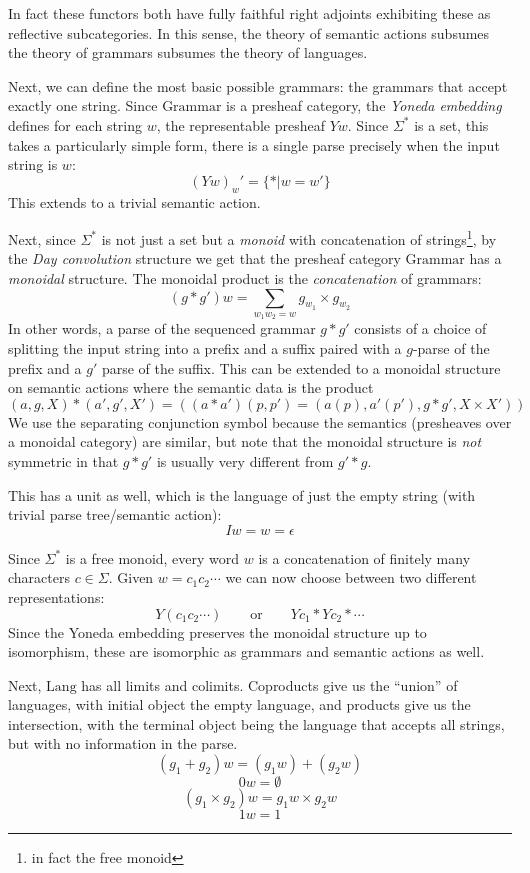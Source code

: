 \documentclass[12pt]{article}
\newcommand{\Lang}{\textrm{Lang}}
\newcommand{\Grammar}{\textrm{Grammar}}
\newcommand\sepconj{\mathbin{*}}
\begin{document}
In fact these functors both have fully faithful right adjoints
exhibiting these as reflective subcategories. In this sense, the
theory of semantic actions subsumes the theory of grammars subsumes
the theory of languages.

Next, we can define the most basic possible grammars: the grammars
that accept exactly one string.
%
Since $\Grammar$ is a presheaf category, the \emph{Yoneda embedding}
defines for each string $w$, the representable presheaf $Y w$. Since
$\Sigma^*$ is a set, this takes a particularly simple form, there is a
single parse precisely when the input string is $w$:
\[ (Y w)_w' = \{ * | w = w' \} \]
%
This extends to a trivial semantic action.

Next, since $\Sigma^*$ is not just a set but a \emph{monoid} with
concatenation of strings\footnote{in fact the free monoid}, by the
\emph{Day convolution} structure we get that the presheaf category
$\Grammar$ has a \emph{monoidal} structure. The monoidal product is
the \emph{concatenation} of grammars:
\[ (g \sepconj g')w = \sum_{w_1w_2 = w} g_{w_1} \times g_{w_2}\]
In other words, a parse of the sequenced grammar $g \sepconj g'$
consists of a choice of splitting the input string into a prefix and a
suffix paired with a $g$-parse of the prefix and a $g'$ parse of the
suffix. This can be extended to a monoidal structure on semantic
actions where the semantic data is the product
\[ (a, g, X) \sepconj (a', g', X') = ((a\sepconj a')(p,p') = (a(p), a'(p'), g \sepconj g', X \times X'))\]
We use the separating conjunction symbol because the semantics
(presheaves over a monoidal category) are similar, but note that the
monoidal structure is \emph{not} symmetric in that $g \sepconj g'$ is
usually very different from $g' \sepconj g$.

This has a unit as well, which is the language of just the empty
string (with trivial parse tree/semantic action):
\[ I w = w = \epsilon \]

Since $\Sigma^*$ is a free monoid, every word $w$ is a concatenation
of finitely many characters $c \in \Sigma$. Given $w = c_1c_2\cdots$
we can now choose between two different representations:
\[ Y(c_1c_2\cdots) \qquad \textrm{or} \qquad Yc_1 \sepconj Yc_2 \sepconj \cdots\]
Since the Yoneda embedding preserves the monoidal structure up to
isomorphism, these are isomorphic as grammars and semantic actions as
well.

Next, $\Lang$ has all limits and colimits. Coproducts give us the
``union'' of languages, with initial object the empty language, and
products give us the intersection, with the terminal object being the
language that accepts all strings, but with no information in the
parse.
\[ (g_1 + g_2) w = (g_1 w) + (g_2 w) \]
\[ 0 w = \emptyset \]
\[ (g_1 \times g_2) w =  g_1 w \times g_2 w\]
\[ 1 w =  1 \]
\end{document}
